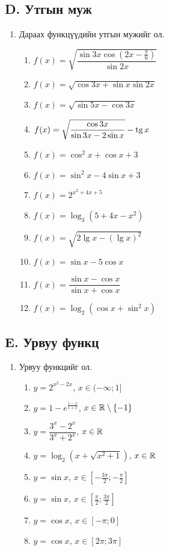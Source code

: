 \subsection*{D. Утгын муж}
\begin{enumerate}[resume]
\item Дараах функцүүдийн утгын мужийг ол.
\begin{enumerate}
  \item $f(x)=\sqrt{\dfrac{\sin3x\cos\left(2x-\frac{\pi}{6}\right)}{\sin2x}}$
  \item $f(x)=\sqrt{\cos3x+\sin x\sin2x}$
  \item $f(x)=\sqrt{\sin5x-\cos3x}$
  \item $f(x)=\sqrt{\dfrac{\cos3x}{\sin3x-2\sin x}}-\operatorname{tg} x$
  \item $f(x)=\cos^2x+\cos x+3$
  \item $f(x)=\sin^2x-4\sin x+3$
  \item $f(x)=2^{x^2+4x+5}$
  \item $f(x)=\log_3(5+4x-x^2)$
  \item $f(x)=\sqrt{2\lg x-(\lg x)^2}$
  \item $f(x)=\sin x-5\cos x$
  \item $f(x)=\dfrac{\sin x-\cos x}{\sin x+\cos x}$
  \item $f(x)=\log_2(\cos x+\sin^2x)$
\end{enumerate}
\end{enumerate}

\subsection*{E. Урвуу функц}
\begin{enumerate}[resume]
\item Урвуу функцийг ол.
\begin{enumerate}
  \item $y=2^{x^2-2x}$, \; $x\in(-\infty;1]$
  \item $y=1-e^{\frac{1-x}{1+x}}$, \; $x\in\mathbb{R}\setminus\{-1\}$
  \item $y=\dfrac{3^x-2^x}{3^x+2^x}$, \; $x\in\mathbb{R}$
  \item $y=\log_2\!\left(x+\sqrt{x^2+1}\right)$, \; $x\in\mathbb{R}$
  \item $y=\sin x$, \; $x\in\left[-\frac{3\pi}{2};-\frac{\pi}{2}\right]$
  \item $y=\sin x$, \; $x\in\left[\frac{\pi}{2};\frac{3\pi}{2}\right]$
  \item $y=\cos x$, \; $x\in[-\pi;0]$
  \item $y=\cos x$, \; $x\in[2\pi;3\pi]$
\end{enumerate}
\end{enumerate}

